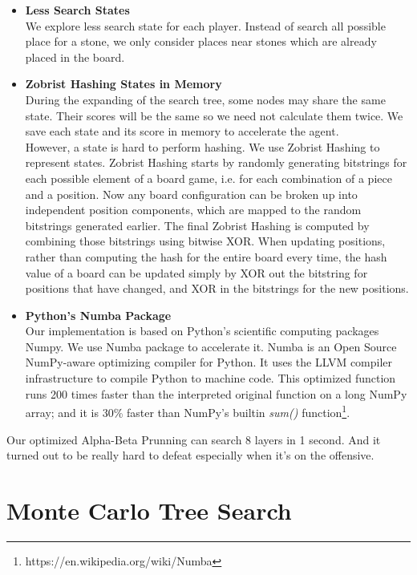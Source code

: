 \documentclass[12pt,a4paper]{article}
\begin{document}
\begin{itemize}
\item \textbf{Less Search States}\\
We explore less search state for each player. Instead of search all possible place for a stone, we only consider places near stones which are already placed in the board.
\item \textbf{Zobrist Hashing States in Memory}\\
During the expanding of the search tree, some nodes may share the same state. Their scores will be the same so we need not calculate them twice. We save each state and its score in memory to accelerate the agent.\\
However, a state is hard to perform hashing. We use Zobrist Hashing to represent states. Zobrist Hashing starts by randomly generating bitstrings for each possible element of a board game, i.e. for each combination of a piece and a position. Now any board configuration can be broken up into independent position components, which are mapped to the random bitstrings generated earlier. The final Zobrist Hashing is computed by combining those bitstrings using bitwise XOR. When updating positions, rather than computing the hash for the entire board every time, the hash value of a board can be updated simply by XOR out the bitstring for positions that have changed, and XOR in the bitstrings for the new positions.
\item \textbf{Python's Numba Package}\\
Our implementation is based on Python's scientific computing packages Numpy. We use Numba package to accelerate it. Numba is an Open Source NumPy-aware optimizing compiler for Python. It uses the LLVM compiler infrastructure to compile Python to machine code. This optimized function runs 200 times faster than the interpreted original function on a long NumPy array; and it is 30\% faster than NumPy's builtin \emph{sum()} function\footnote{https://en.wikipedia.org/wiki/Numba}.

\end{itemize}



Our optimized Alpha-Beta Prunning can search 8 layers in 1 second. And it turned out to be really hard to defeat especially when it's on the offensive.

\section{Monte Carlo Tree Search}
\end{document}
